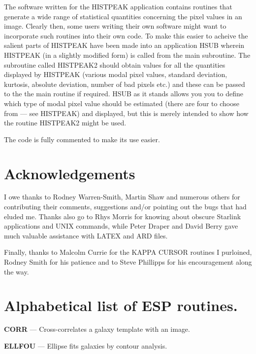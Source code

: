 \documentclass[twoside,11pt]{article}
\newcommand{\xref}[3]{#1}
\newcommand{\xlabel}[1]{}
\begin{document}
The software written for the HISTPEAK application contains routines that generate 
a wide range of statistical quantities concerning the pixel values in
an image. Clearly then, some users writing their own software might want to 
incorporate such routines into their own code. To make this easier to acheive 
the salient parts of HISTPEAK have been made into an application HSUB wherein
HISTPEAK (in a slightly modified form) is called from the main subroutine.
The subroutine called HISTPEAK2 should obtain values for all the 
quantities displayed by HISTPEAK (various modal pixel values, standard 
deviation, kurtosis, absolute deviation, number of bad pixels etc.) and these 
can be passed to the the main routine if required. HSUB as it stands allows you 
you to define which type of modal pixel value should be estimated
(there are four to choose from --- see HISTPEAK) and displayed, but this
is merely intended to show how the routine HISTPEAK2 might be used.

The code is fully commented to make its use easier. 


\section{Acknowledgements}
\label{sec:acknowledgements}

I owe thanks to Rodney Warren-Smith, Martin Shaw and numerous others for
contributing their comments, suggestions and/or pointing out the bugs that had
eluded me. Thanks also go to Rhys Morris for knowing about obscure Starlink 
applications and UNIX commands, while Peter Draper  and David Berry gave 
much valuable assistance with LATEX and ARD files.

Finally, thanks to Malcolm Currie for the \xref{KAPPA}{sun95}{} CURSOR routines I purloined, 
Rodney Smith for his patience and to Steve Phillipps for his encouragement 
along the way.

\newpage
\appendix

\newpage

\section{Alphabetical list of ESP routines.}
\xlabel{ALPHABETICAL}
\label{app:alphabetical}

%
%
{\bf CORR}{ --- Cross-correlates a galaxy template with an image.}
\pageref{des:CORR}

{\bf ELLFOU}{ --- Ellipse fits galaxies by contour analysis.}
\pageref{des:ELLFOU}
\end{document}
